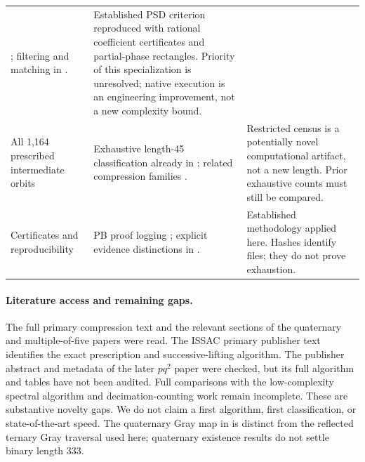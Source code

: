 \documentclass[11pt]{article}
\begin{document}
\begin{longtable}{p{.22\linewidth}p{.35\linewidth}p{.35\linewidth}}
\cite[Section 5.1]{fletcher}; filtering and matching in
\cite[Sections 2 and 3.4]{lumsden}. & Established PSD criterion reproduced
with rational coefficient certificates and partial-phase rectangles.
Priority of this specialization is unresolved; native execution is an
engineering improvement, not a new complexity bound.\\
All 1,164 prescribed intermediate orbits & Exhaustive length-45 classification
already in \cite[Section 5.4, Table 3]{fletcher}; related compression families
\cite{mod5}. & Restricted census is a potentially novel computational
artifact, not a new length. Prior exhaustive counts must still be compared.\\
Certificates and reproducibility & PB proof logging \cite{koops}; explicit
evidence distinctions in \cite{lebedev}. & Established methodology applied
here. Hashes identify files; they do not prove exhaustion.\\
\bottomrule
\end{longtable}

\paragraph{Literature access and remaining gaps.}
The full primary compression text and the relevant sections of the quaternary
and multiple-of-five papers were read. The ISSAC primary publisher text identifies the exact
prescription and successive-lifting algorithm. The publisher abstract and
metadata of the later $pq^2$ paper were checked, but its full algorithm and
tables have not been audited. Full comparisons with the low-complexity
spectral algorithm and decimation-counting
work remain incomplete. These are substantive novelty gaps. We do not claim
a first algorithm, first classification, or state-of-the-art speed.
The quaternary Gray map in \cite{lebedev} is distinct from the reflected
ternary Gray traversal used here; quaternary existence results do not settle
binary length 333.
\end{document}
